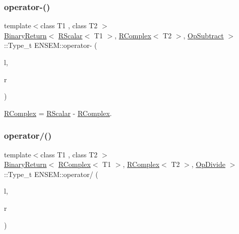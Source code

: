 \subsubsection{\texorpdfstring{operator-\/()}{operator-()}\hspace{0.1cm}{\footnotesize\ttfamily [4/4]}}
{\footnotesize\ttfamily template$<$class T1 , class T2 $>$ \\
\mbox{\hyperlink{structENSEM_1_1BinaryReturn}{Binary\+Return}}$<$ \mbox{\hyperlink{classENSEM_1_1RScalar}{R\+Scalar}}$<$ T1 $>$, \mbox{\hyperlink{classENSEM_1_1RComplex}{R\+Complex}}$<$ T2 $>$, \mbox{\hyperlink{structENSEM_1_1OpSubtract}{Op\+Subtract}} $>$\+::Type\+\_\+t E\+N\+S\+E\+M\+::operator-\/ (\begin{DoxyParamCaption}\item[{const \mbox{\hyperlink{classENSEM_1_1RScalar}{R\+Scalar}}$<$ T1 $>$ \&}]{l,  }\item[{const \mbox{\hyperlink{classENSEM_1_1RComplex}{R\+Complex}}$<$ T2 $>$ \&}]{r }\end{DoxyParamCaption})\hspace{0.3cm}{\ttfamily [inline]}}



\mbox{\hyperlink{classENSEM_1_1RComplex}{R\+Complex}} = \mbox{\hyperlink{classENSEM_1_1RScalar}{R\+Scalar}} -\/ \mbox{\hyperlink{classENSEM_1_1RComplex}{R\+Complex}}. 

\mbox{\label{group__rcomplex_ga60f2bd381cb984f9f438b894a2aef66f}} 
\subsubsection{\texorpdfstring{operator/()}{operator/()}\hspace{0.1cm}{\footnotesize\ttfamily [1/3]}}
{\footnotesize\ttfamily template$<$class T1 , class T2 $>$ \\
\mbox{\hyperlink{structENSEM_1_1BinaryReturn}{Binary\+Return}}$<$ \mbox{\hyperlink{classENSEM_1_1RComplex}{R\+Complex}}$<$ T1 $>$, \mbox{\hyperlink{classENSEM_1_1RComplex}{R\+Complex}}$<$ T2 $>$, \mbox{\hyperlink{structENSEM_1_1OpDivide}{Op\+Divide}} $>$\+::Type\+\_\+t E\+N\+S\+E\+M\+::operator/ (\begin{DoxyParamCaption}\item[{const \mbox{\hyperlink{classENSEM_1_1RComplex}{R\+Complex}}$<$ T1 $>$ \&}]{l,  }\item[{const \mbox{\hyperlink{classENSEM_1_1RComplex}{R\+Complex}}$<$ T2 $>$ \&}]{r }\end{DoxyParamCaption})\hspace{0.3cm}{\ttfamily [inline]}}



